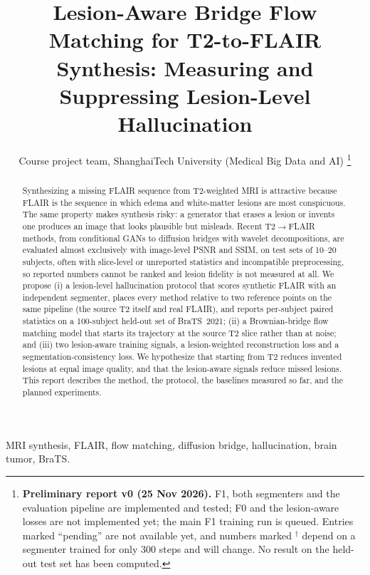 \documentclass[journal]{IEEEtran}
\newcommand{\prelim}{$^{\dagger}$}
\begin{document}
\title{Lesion-Aware Bridge Flow Matching for T2-to-FLAIR Synthesis: Measuring and Suppressing Lesion-Level Hallucination}

\author{Course project team, ShanghaiTech University (Medical Big Data and AI)%
\thanks{\textbf{Preliminary report v0 (25 Nov 2026).} F1, both segmenters and the evaluation pipeline are implemented and tested; F0 and the lesion-aware losses are not implemented yet; the main F1 training run is queued. Entries marked ``pending'' are not available yet, and numbers marked \prelim{} depend on a
segmenter trained for only 300 steps and will change. No result on the held-out test set has been computed.}}

\maketitle

\begin{abstract}
Synthesizing a missing FLAIR sequence from T2-weighted MRI is attractive because FLAIR is the sequence in which edema and
white-matter lesions are most conspicuous. The same property makes synthesis risky: a generator that erases a lesion or
invents one produces an image that looks plausible but misleads. Recent T2$\to$FLAIR methods, from conditional GANs to
diffusion bridges with wavelet decompositions, are evaluated almost exclusively with image-level PSNR and SSIM, on test sets of 10--20 subjects, often with slice-level or unreported statistics and incompatible preprocessing, so reported numbers cannot be
ranked and lesion fidelity is not measured at all. We propose (i) a lesion-level hallucination protocol that scores
synthetic FLAIR with an independent segmenter, places every method relative to two reference points on the same pipeline (the source T2 itself and real FLAIR), and reports per-subject paired statistics on a 100-subject held-out set of BraTS~2021; (ii) a Brownian-bridge flow
matching model that starts its trajectory at the source T2 slice rather than at noise; and (iii) two lesion-aware training
signals, a lesion-weighted reconstruction loss and a segmentation-consistency loss. We hypothesize that starting from T2
reduces invented lesions at equal image quality, and that the lesion-aware signals reduce missed lesions. This report
describes the method, the protocol, the baselines measured so far, and the planned experiments.
\end{abstract}

\begin{IEEEkeywords}
MRI synthesis, FLAIR, flow matching, diffusion bridge, hallucination, brain tumor, BraTS.
\end{IEEEkeywords}
\end{document}
